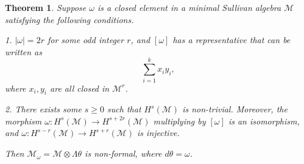 \documentclass{article}
\theoremstyle{plain}
\newtheorem{thm}{Theorem}[section]
\theoremstyle{definition}
\theoremstyle{plain}
\numberwithin{equation}{section}
\begin{document}
\begin{thm}\label{HL and reducible non-formal}
Suppose $\omega$ is a closed element in a minimal Sullivan algebra $\mathcal{M}$ satisfying the following conditions.

1. $|\omega|=2r$ for some odd integer $r$, and $[\omega]$ has a representative that can be written as
$$
\sum_{i=1}^k x_iy_i,
$$
where $x_i,y_i$ are all closed in $\mathcal{M}^r$.

2. There exists some $s\geq0$ such that $H^s(\mathcal{M})$ is non-trivial. Moreover, the morphism $\omega:H^s(\mathcal{M})\to H^{s+2r}(\mathcal{M})$ multiplying by $[\omega]$ is an isomorphism, and $\omega:H^{s-r}(\mathcal{M})\to H^{s+r}(\mathcal{M})$ is injective.

Then $\mathcal{M}_{\omega}=\mathcal{M}\otimes \Lambda\theta$ is non-formal, where $d\theta=\omega$.
\end{thm}
\end{document}
